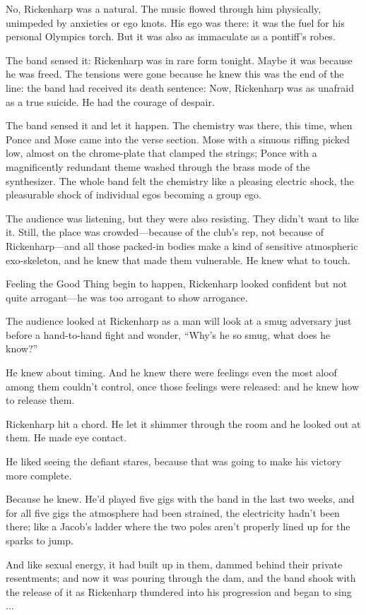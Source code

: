 No, Rickenharp was a natural. The music flowed through him physically, unimpeded by anxieties or ego knots. His ego was there: it was the fuel for his personal Olympics torch. But it was also as immaculate as a pontiff's robes.

The band sensed it: Rickenharp was in rare form tonight. Maybe it was because he was freed. The tensions were gone because he knew this was the end of the line: the band had received its death sentence: Now, Rickenharp was as unafraid as a true suicide. He had the courage of despair.

The band sensed it and let it happen. The chemistry was there, this time, when Ponce and Mose came into the verse section. Mose with a sinuous riffing picked low, almost on the chrome-plate that clamped the strings; Ponce with a magnificently redundant theme washed through the brass mode of the synthesizer. The whole band felt the chemistry like a pleasing electric shock, the pleasurable shock of individual egos becoming a group ego.

The audience was listening, but they were also resisting. They didn't want to like it. Still, the place was crowded—because of the club's rep, not because of Rickenharp—and all those packed-in bodies make a kind of sensitive atmospheric exo-skeleton, and he knew that made them vulnerable. He knew what to touch.

Feeling the Good Thing begin to happen, Rickenharp looked confident but not quite arrogant—he was too arrogant to show arrogance.

The audience looked at Rickenharp as a man will look at a smug adversary just before a hand-to-hand fight and wonder, ``Why's he so smug, what does he know?''

He knew about timing. And he knew there were feelings even the most aloof among them couldn't control, once those feelings were released: and he knew how to release them.

Rickenharp hit a chord. He let it shimmer through the room and he looked out at them. He made eye contact.

He liked seeing the defiant stares, because that was going to make his victory more complete.

Because he knew. He'd played five gigs with the band in the last two weeks, and for all five gigs the atmosphere had been strained, the electricity hadn't been there; like a Jacob's ladder where the two poles aren't properly lined up for the sparks to jump.

And like sexual energy, it had built up in them, dammed behind their private resentments; and now it was pouring through the dam, and the band shook with the release of it as Rickenharp thundered into his progression and began to sing ...

